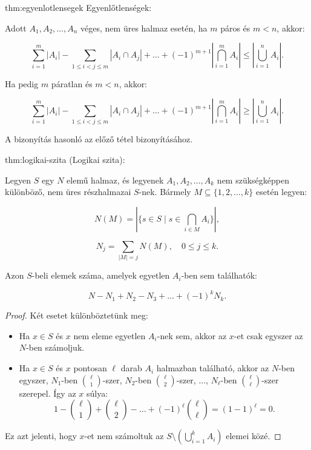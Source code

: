 \begin{theorem}{thm:egyenlotlensegek}
Egyenlőtlenségek:

Adott $A_{1},A_{2},\dots,A_{n}$ véges, nem üres halmaz esetén, ha
$m$ páros és $m<n$, akkor:

\begin{equation}
\sum_{i=1}^{m}|A_{i}|-\sum_{1\leq i<j\leq m}|A_{i}\cap A_{j}|+\dots+(-1)^{m+1}\left|\bigcap_{i=1}^{m}A_{i}\right|\leq\left|\bigcup_{i=1}^{n}A_{i}\right|.
\end{equation}

Ha pedig $m$ páratlan és $m<n$, akkor:

\begin{equation}
\sum_{i=1}^{m}|A_{i}|-\sum_{1\leq i<j\leq m}|A_{i}\cap A_{j}|+\dots+(-1)^{m+1}\left|\bigcap_{i=1}^{m}A_{i}\right|\geq\left|\bigcup_{i=1}^{n}A_{i}\right|.
\end{equation}
\end{theorem}

A bizonyítás hasonló az előző tétel bizonyításához.
\begin{theorem}{thm:logikai-szita}
(Logikai szita):

Legyen $S$ egy $N$ elemű halmaz, és legyenek $A_{1},A_{2},\dots,A_{k}$
nem szükségképpen különböző, nem üres részhalmazai $S$-nek. Bármely
$M\subseteq\{1,2,\dots,k\}$ esetén legyen:

\begin{equation}
N(M)=\left|\{s\in S\mid s\in\bigcap_{i\in M}A_{i}\}\right|,
\end{equation}

\begin{equation}
N_{j}=\sum_{|M|=j}N(M),\quad0\leq j\leq k.
\end{equation}

Azon $S$-beli elemek száma, amelyek egyetlen $A_{i}$-ben sem találhatók:

\begin{equation}
N-N_{1}+N_{2}-N_{3}+\dots+(-1)^{k}N_{k}.
\end{equation}
\end{theorem}

\begin{proof}
Két esetet különböztetünk meg: 
\begin{itemize}
\item Ha $x\in S$ és $x$ nem eleme egyetlen $A_{i}$-nek sem, akkor az
$x$-et csak egyszer az $N$-ben számoljuk. 
\item Ha $x\in S$ és $x$ pontosan $\ell$ darab $A_{i}$ halmazban található,
akkor az $N$-ben egyszer, $N_{1}$-ben $\binom{\ell}{1}$-szer, $N_{2}$-ben
$\binom{\ell}{2}$-szer, ..., $N_{\ell}$-ben $\binom{\ell}{\ell}$-szer
szerepel. Így az $x$ súlya: 
\begin{equation}
1-\binom{\ell}{1}+\binom{\ell}{2}-\dots+(-1)^{\ell}\binom{\ell}{\ell}=(1-1)^{\ell}=0.
\end{equation}
\end{itemize}
Ez azt jelenti, hogy $x$-et nem számoltuk az $S\setminus\left(\bigcup_{i=1}^{k}A_{i}\right)$
elemei közé. 
\end{proof}
\vspace{5mm}

